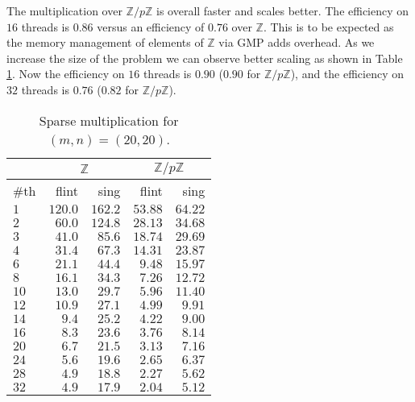 \documentclass{deliverablereport}
\begin{document}
The multiplication over $\mathbb{Z}/p \mathbb{Z}$ is overall faster and scales better. The efficiency on $16$ threads is $0.86$ versus an efficiency of $0.76$ over $\mathbb{Z}$. This is to be expected as the memory management of elements of $\mathbb{Z}$ via \textsc{GMP} adds overhead. As we increase the size of the problem we can observe better scaling as shown in Table \ref{table_sparse_mul2}. Now the efficiency on $16$ threads is $0.90$ ($0.90$ for $\mathbb{Z}/p \mathbb{Z}$), and the efficiency on $32$ threads is $0.76$ ($0.82$ for $\mathbb{Z}/p \mathbb{Z}$).
\begin{table}
\begin{tabular}{l | r | r | r | r | }
& \multicolumn{2}{|c|}{$\mathbb{Z}$} & \multicolumn{2}{|c|}{$\mathbb{Z}/p \mathbb{Z}$} \\ \hline
\#th   & flint & sing & flint & sing\\ \hline
$1$   & $120.0$ & $162.2$ &$53.88$ & $64.22$\\ \hline
$2$   & $60.0$ & $124.8$ &$28.13$ & $34.68$\\ \hline
$3$   & $41.0$ & $85.6$ &$18.74$ & $29.69$\\ \hline
$4$   & $31.4$ & $67.3$ &$14.31$ & $23.87$\\ \hline
$6$   & $21.1$ & $44.4$ &$9.48$ & $15.97$\\ \hline
$8$   & $16.1$ & $34.3$ &$7.26$ & $12.72$\\ \hline
$10$  & $13.0$ & $29.7$ &$5.96$ & $11.40$\\ \hline
$12$  & $10.9$ & $27.1$ &$4.99$ & $9.91$\\ \hline
$14$  & $9.4$ &  $25.2$  &$4.22$ & $9.00$\\ \hline
$16$  & $8.3$ &  $23.6$  &$3.76$ & $8.14$\\ \hline
$20$  & $6.7$ &  $21.5$  &$3.13$ & $7.16$\\ \hline
$24$  & $5.6$ &  $19.6$  &$2.65$ & $6.37$\\ \hline
$28$  & $4.9$ &  $18.8$  &$2.27$ & $5.62$\\ \hline
$32$  & $4.9$ &  $17.9$  &$2.04$ & $5.12$\\ \hline
\end{tabular}
\caption{Sparse multiplication for $(m, n) = (20, 20)$.}
\label{table_sparse_mul2}
\end{table}
\end{document}
